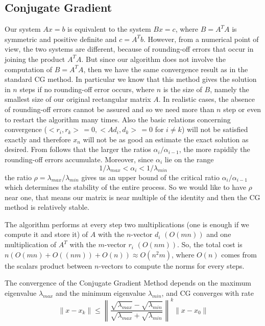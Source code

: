 \documentclass{article}
\begin{document}
\subsection{Conjugate Gradient}\label{subsec:conjugate-gradient}
Our system $Ax = b$ is equivalent to the system $Bx = c$, where $B = A^{T}A$ is symmetric and positive definite and $c = A^{T}b$. However, from a numerical point of view, the two systems are different, because of rounding-off errors that occur in joining the product $A^{T}A$. But since our algorithm does not involve the computation of $B = A^{T}A$, then we have the same convergence result as in the standard CG method. In particular we know that this method gives the solution in $n$ steps if no rounding-off error occurs, where $n$ is the size of $B$, namely the smallest size of our original rectangular matrix $A$. In realistic cases, the absence of rounding-off errors cannot be assured and so we need more than $n$ step or even to restart the algorithm many times. Also the basic relations concerning convergence ($<r_i,r_k>\,= 0, <Ad_i,d_k>\,= 0$ for $i \ne k$) will not be satisfied exactly and therefore $x_n$ will not be as good an estimate the exact solution as desired. From \cite{hestenes1952methods} follows that the larger the ratios $\alpha_i / \alpha_{i-1}$, the more rapidily the rounding-off errors accumulate. Moreover, since $\alpha_i$ lie on the range
\[
1 / \lambda_{max} < \alpha_i < 1 / \lambda_{min}
\] 
the ratio $\rho = \lambda_{max}/\lambda_{min}$ gives us an upper bound of the critical ratio  $\alpha_i / \alpha_{i-1}$ which determines the stability of the entire process. So we would like to have $\rho$ near one, that means our matrix is near multiple of the identity and then the CG method is relatively stable. 

The algorithm performs at every step two multiplications  (one is enough if we compute it and store it) of $A$ with the $n$-vector $d_i$ $(O(mn))$ and one multiplication of $A^{T}$ with the $m$-vector $r_i$ $(O(nm))$. 
So, the total cost is $n(O(mn) + O((nm)) + O(n)) \approx O(n^2m)$, where $O(n)$ comes from the scalars product between $n$-vectors to compute the norms for every steps.

The convergence of the Conjugate Gradient Method depends on the maximum eigenvalue $\lambda_{max}$ and the minimum eigenvalue $\lambda_{min}$, and CG converges with rate 
\begin{equation}\label{eq:cgconv}
\|x-x_{k}\| \leq \left\lVert\frac{\sqrt{\lambda_{max}}-\sqrt{\lambda_{min}}}{\sqrt{\lambda_{max}}+\sqrt{\lambda_{min}}}\right\rVert^{k}  \|x - x_{0}\| 
\end{equation}
\end{document}
